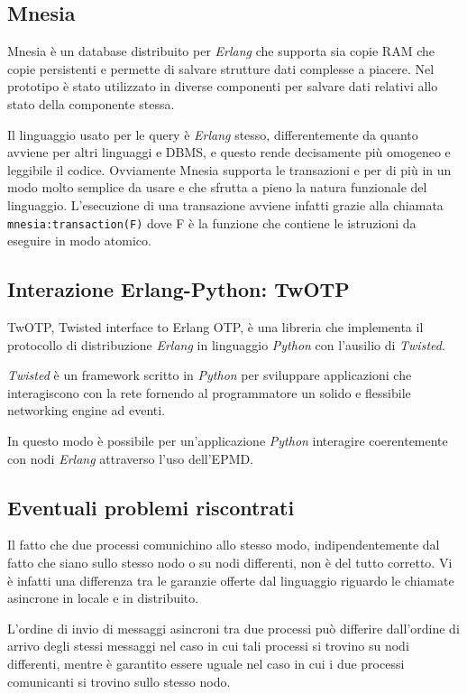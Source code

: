 \documentclass[11pt,a4paper]{report}
\newcommand{\fun}[1]{\texttt{#1}}
\begin{document}
\subsection*{Mnesia}
Mnesia è un database distribuito per \textit{Erlang} che supporta sia copie RAM che copie persistenti e permette di salvare strutture dati complesse a piacere. Nel prototipo è stato utilizzato in diverse componenti per salvare dati relativi allo stato della componente stessa.

Il linguaggio usato per le query è \textit{Erlang} stesso, differentemente da quanto avviene per altri linguaggi e DBMS, e questo rende decisamente più omogeneo e leggibile il codice. Ovviamente Mnesia supporta le transazioni e per di più in un modo molto semplice da usare e che sfrutta a pieno la natura funzionale del linguaggio. L'esecuzione di una transazione avviene infatti grazie alla chiamata \fun{mnesia:transaction(F)} dove F è la funzione che contiene le istruzioni da eseguire in modo atomico.
\subsection*{Interazione Erlang-Python: TwOTP}
TwOTP, Twisted interface to Erlang OTP, è una libreria che implementa il protocollo di distribuzione \textit{Erlang} in linguaggio \textit{Python} con l'ausilio di \textit{Twisted}.

\textit{Twisted} è un framework scritto in \textit{Python} per sviluppare applicazioni che interagiscono con la rete fornendo al programmatore un solido e flessibile networking engine ad eventi.

In questo modo è possibile per un'applicazione \textit{Python} interagire coerentemente con nodi \textit{Erlang} attraverso l'uso dell'EPMD.

\subsection*{Eventuali problemi riscontrati}
Il fatto che due processi comunichino allo stesso modo, indipendentemente dal fatto che siano sullo stesso nodo o su nodi differenti, non è del tutto corretto. Vi è infatti una differenza tra le garanzie offerte dal linguaggio riguardo le chiamate asincrone in locale e in distribuito.

L'ordine di invio di messaggi asincroni tra due processi può differire dall'ordine di arrivo degli stessi messaggi nel caso in cui tali processi si trovino su nodi differenti, mentre è garantito essere uguale nel caso in cui i due processi comunicanti si trovino sullo stesso nodo.
\end{document}
